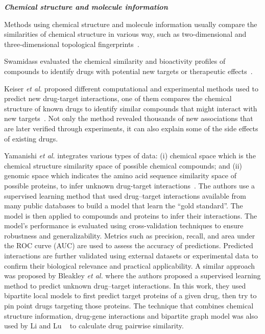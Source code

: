 \textit{\textbf{Chemical structure and molecule information}}

Methods using chemical structure and molecule information usually compare the similarities of chemical structure in various way, such as two-dimensional and three-dimensional topological fingerprints~\cite{rognan2007chemogenomic, pihan2012drug3d, novick2013sweetlead}.

Swamidass evaluated the chemical similarity and bioactivity profiles of compounds to identify drugs with potential new targets or therapeutic effects~\cite{swamidass2011mining}. 

Keiser \textit{et  al.}  proposed different computational and experimental methods used to predict new drug-target interactions, one of them compares the chemical structure of known drugs to identify similar compounds that might interact with new targets~\cite{keiser2009predicting}.  Not only the method revealed thousands of new associations that are later verified through experiments, it can also explain some of the side effects of existing drugs.

Yamanishi \textit{et  al.} integrates various types of data: (i) chemical space which is the chemical structure similarity space of possible chemical compounds; and (ii) genomic space which indicates the amino acid sequence similarity space of possible proteins, to infer unknown drug-target interactions~\cite{bleakley2009supervised}. The authors use a supervised learning method that used  drug–target interactions available from many public databases to build a model that learn the ``gold standard''. The model is then applied to compounds and proteins to infer their interactions. The model’s performance is evaluated using cross-validation techniques to ensure robustness and generalizability. Metrics such as precision, recall, and area under the ROC curve (AUC) are used to assess the accuracy of predictions. Predicted interactions are further validated using external datasets or experimental data to confirm their biological relevance and practical applicability.
A similar approach was proposed by Bleakley \textit{et al.} where the authors proposed a supervised learning method to predict unknown drug–target interactions. In this work, they used bipartite local models to first predict target proteins of a given drug, then try to pin point drugs targeting those proteins.
The technique that combines chemical structure information, drug-gene interactions and bipartite graph model was also used by Li and Lu ~\cite{li2012new} to calculate drug pairwise similarity.

